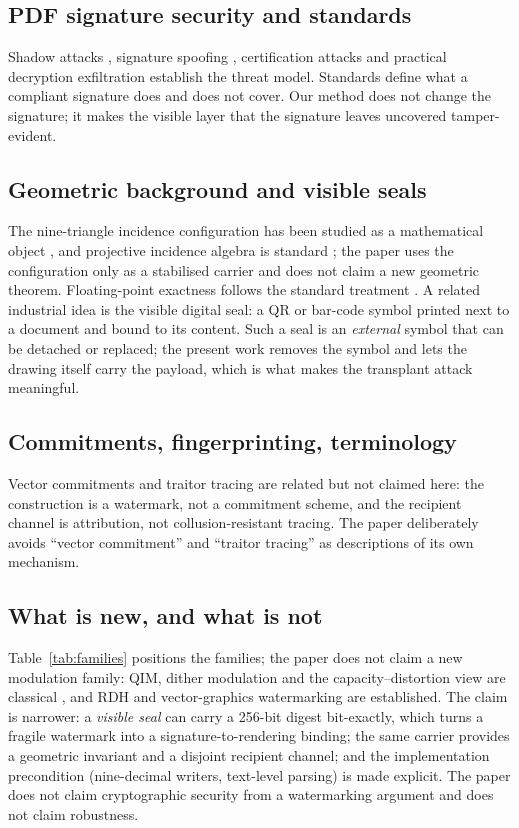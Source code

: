 \documentclass[journal]{IEEEtran}
\begin{document}
\subsection{PDF signature security and standards}
Shadow attacks \cite{mainka2021}, signature spoofing \cite{mladenov2019}, certification attacks \cite{rohlmann2021} and practical decryption exfiltration \cite{muller2019} establish the threat model. Standards \cite{iso32000,etsipades,eidas} define what a compliant signature does and does not cover. Our method does not change the signature; it makes the visible layer that the signature leaves uncovered tamper-evident.

\subsection{Geometric background and visible seals}
The nine-triangle incidence configuration has been studied as a mathematical object
\cite{kulaichev1984,huet2002}, and projective incidence algebra is standard
\cite{richtergebert2011}; the paper uses the configuration only as a stabilised carrier and does not
claim a new geometric theorem. Floating-point exactness follows the standard treatment
\cite{muller2018}. A related industrial idea is the visible digital seal: a QR or bar-code symbol
printed next to a document and bound to its content. Such a seal is an \emph{external} symbol that
can be detached or replaced; the present work removes the symbol and lets the drawing itself carry
the payload, which is what makes the transplant attack meaningful.

\subsection{Commitments, fingerprinting, terminology}
Vector commitments \cite{catalano2013,libert2016} and traitor tracing \cite{boneh1999,tardos2008} are related but not claimed here: the construction is a watermark, not a commitment scheme, and the recipient channel is attribution, not collusion-resistant tracing. The paper deliberately avoids ``vector commitment'' and ``traitor tracing'' as descriptions of its own mechanism.

\subsection{What is new, and what is not}
Table~\ref{tab:families} positions the families; the paper does not claim a new modulation family: QIM, dither modulation and the capacity--distortion view are classical \cite{chen2001,eggers2003,perez2004}, and RDH \cite{tian2003,ni2006,thodi2007} and vector-graphics watermarking \cite{doncel2007,li2003,hou2014} are established. The claim is narrower: a \emph{visible seal} can carry a 256-bit digest bit-exactly, which turns a fragile watermark into a signature-to-rendering binding; the same carrier provides a geometric invariant and a disjoint recipient channel; and the implementation precondition (nine-decimal writers, text-level parsing) is made explicit. The paper does not claim cryptographic security from a watermarking argument and does not claim robustness.
\end{document}
